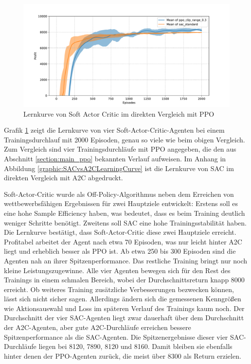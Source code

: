 \begin{figure}[htb]
	\centering
	\includegraphics[width=\textwidth]{main/ppo_vs_sac.pdf}
	\caption{Lernkurve von Soft Actor Critic im direkten Vergleich mit PPO}
	\label{graphic:SACLearningCurve}
\end{figure}

Grafik \ref{graphic:SACLearningCurve} zeigt die Lernkurve von vier Soft-Actor-Critic-Agenten bei einem Trainingsdurchlauf mit 2000 Episoden, genau so viele wie beim obigen Vergleich.
Zum Vergleich sind vier Trainingsdurchläufe mit PPO angegeben, die den aus Abschnitt \ref{section:main_ppo} bekannten Verlauf aufweisen.
Im Anhang in Abbildung \ref{graphic:SACvsA2CLearningCurve} ist die Lernkurve von SAC im direkten Vergleich mit A2C abgedruckt.

Soft-Actor-Critic wurde als Off-Policy-Algorithmus neben dem Erreichen von wettbewerbsfähigen Ergebnissen für zwei Hauptziele entwickelt:
Erstens soll es eine hohe Sample Efficiency haben, was bedeutet, dass es beim Training deutlich weniger Schritte benötigt.
Zweitens soll SAC eine hohe Trainingsstabilität haben.
Die Lernkurve bestätigt, dass Soft-Actor-Critic diese zwei Hauptziele erreicht.
Profitabel arbeitet der Agent nach etwa 70 Episoden, was nur leicht hinter A2C liegt und erheblich besser als PPO ist.
Ab etwa 250 bis 300 Episoden sind die Agenten nah an ihrer Spitzenperformance.
Das restliche Training bringt nur noch kleine Leistungszugewinne.
Alle vier Agenten bewegen sich für den Rest des Trainings in einem schmalen Bereich, wobei der Durchschnittsreturn knapp 8000 erreicht.
Ob weiteres Training zusätzliche Verbesserungen bezwecken können, lässt sich nicht sicher sagen.
Allerdings ändern sich die gemessenen Kenngrößen wie Aktionsauswahl und Loss im späteren Verlauf des Trainings kaum noch.
Der Durchschnitt der vier SAC-Agenten liegt zwar dauerhaft über dem Durchschnitt der A2C-Agenten, aber gute A2C-Durchläufe erreichen bessere Spitzenperformance als die SAC-Agenten.
Die Spitzenergebnisse dieser vier SAC-Durchläufe liegen bei 8120, 7890, 8120 und 8160.
Damit bleiben sie ebenfalls hinter denen der PPO-Agenten zurück, die meist über 8300 als Return erzielen.

